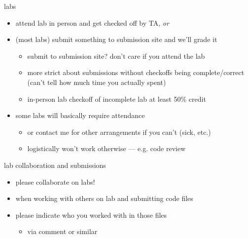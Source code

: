 \begin{frame}{labs}
    \begin{itemize}
    \item attend lab in person and get checked off by TA, \textit{or}
    \item (most labs) submit something to submission site and we'll grade it
        \begin{itemize}
        \item submit to submission site? don't care if you attend the lab
        \item more strict about submissions without checkoffs being complete/correct \\
            (can't tell how much time you actually spent)
        \item in-person lab checkoff of incomplete lab at least 50\% credit
        \end{itemize}
    \item some labs will basically require attendance
        \begin{itemize}
        \item or contact me for other arrangements if you can't (sick, etc.)
        \item logistically won't work otherwise --- e.g. code review
        \end{itemize}
    \end{itemize}
\end{frame}

\begin{frame}{lab collaboration and submissions}
    \begin{itemize}
    \item please collaborate on labs!
    \vspace{.5cm}
    \item when working with others on lab and submitting code files
    \item please indicate who you worked with in those files
        \begin{itemize}
        \item via comment or similar
        \end{itemize}
    \end{itemize}
\end{frame}

